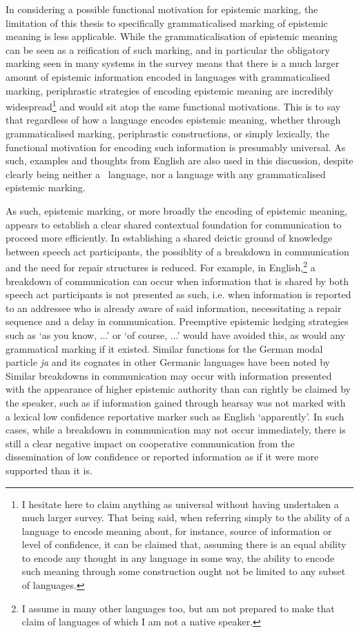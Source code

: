 In considering a possible functional motivation for epistemic marking, the limitation of this thesis to specifically grammaticalised marking of epistemic meaning is less applicable. While the grammaticalisation of epistemic meaning can be seen as a reification of such marking, and in particular the obligatory marking seen in many systems in the survey means that there is a much larger amount of epistemic information encoded in languages with grammaticalised marking, periphrastic strategies of encoding epistemic meaning are incredibly widespread\footnote{I hesitate here to claim anything as universal without having undertaken a much larger survey. That being said, when referring simply to the ability of a language to encode meaning about, for instance, source of information or level of confidence, it can be claimed that, assuming there is an equal ability to encode any thought in any language in some way, the ability to encode such meaning through some construction ought not be limited to any subset of languages.} and would sit atop the same functional motivations. This is to say that regardless of how a language encodes epistemic meaning, whether through grammaticalised marking, periphrastic constructions, or simply lexically, the functional motivation for encoding such information is presumably universal. As such, examples and thoughts from English are also used in this discussion, despite clearly being neither a \lfam\ language, nor a language with any grammaticalised epistemic marking.

As such, epistemic marking, or more broadly the encoding of epistemic meaning, appears to establish a clear shared contextual foundation for communication to proceed more efficiently. In establishing a shared deictic ground of knowledge between speech act participants, the possiblity of a breakdown in communication and the need for repair structures is reduced. For example, in English,\footnote{I assume in many other languages too, but am not prepared to make that claim of languages of which I am not a native speaker.} a breakdown of communication can occur when information that is shared by both speech act participants is not presented as such, i.e. when information is reported to an addressee who is already aware of said information, necessitating a repair sequence and a delay in communication. Preemptive epistemic hedging strategies such as `as you know, ...' or `of course, ...' would have avoided this, as would any grammatical marking if it existed. Similar functions for the German modal particle \textit{ja} and its cognates in other Germanic languages have been noted by  Similar breakdowns in communication may occur with information presented with the appearance of higher epistemic authority than can rightly be claimed by the speaker, such as if information gained through hearsay was not marked with a lexical low confidence reportative marker such as English `apparently'. In such cases, while a breakdown in communication may not occur immediately, there is still a clear negative impact on cooperative communication from the dissemination of low confidence or reported information as if it were more supported than it is.

